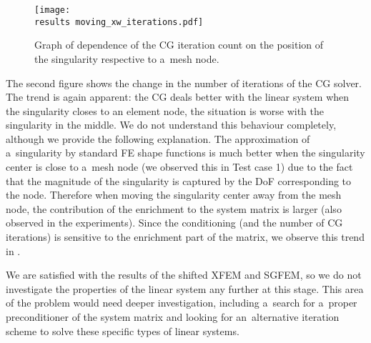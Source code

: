 \begin{figure}[!htb]
  \centering    
    \texttt{[image: \\results moving\_xw\_iterations.pdf]}
  \caption[CG iteration count dependence on singularity position]{Graph of dependence of the CG iteration count
   on the position of the singularity respective to a~mesh node.}
  \label{fig:moving_xw_iterations}
\end{figure}
%
The second figure shows the change in the number of iterations of the CG solver. The trend is again apparent:
the CG deals better with the linear system when the singularity closes to an element node, the situation is worse
with the singularity in the middle. We do not understand this behaviour completely, although we provide the following explanation.
The approximation of a~singularity by standard FE shape functions is much better when the singularity center is close to a~mesh node
(we observed this in Test case 1) due to the fact that the magnitude of the singularity is captured by the DoF corresponding to the node. 
Therefore when moving the singularity center away from the mesh node, the contribution of the enrichment to the system matrix is larger
(also observed in the experiments).
Since the conditioning (and the number of CG iterations) is sensitive to the enrichment part of the matrix,
we observe this trend in .


%         
%

We are satisfied with the results of the shifted XFEM and SGFEM, so we do not investigate the properties of the linear
system any further at this stage. This area of the problem would need deeper investigation, including a~search for a~proper
preconditioner of the system matrix and looking for an~alternative iteration scheme to solve these specific types of linear systems.



